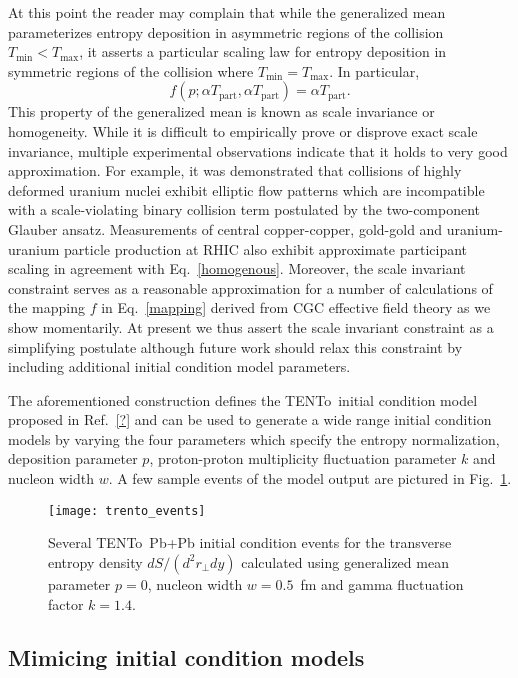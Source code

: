 \documentclass[aps,prc,reprint,amsmath,nofootinbib]{revtex4-1}
\newcommand{\trento}{T\raisebox{-0.5ex}{R}ENTo}
\begin{document}
At this point the reader may complain that while the generalized mean parameterizes entropy deposition in asymmetric regions of the collision $T_\text{min} < T_\text{max}$, it asserts a particular scaling law for entropy deposition in symmetric regions of the collision where $T_\text{min} = T_\text{max}$. In particular, 
\begin{equation}
    \label{homogenous}
    f(p; \alpha T_\text{part}, \alpha T_\text{part}) = \alpha T_\text{part}. 
\end{equation}
This property of the generalized mean is known as scale invariance or homogeneity. While it is difficult to empirically prove or disprove exact scale invariance, multiple experimental observations indicate that it holds to very good approximation. For example, it was demonstrated that collisions of highly deformed uranium nuclei exhibit elliptic flow patterns which are incompatible with a scale-violating binary collision term postulated by the two-component Glauber ansatz. Measurements of central copper-copper, gold-gold and uranium-uranium particle production at RHIC also exhibit approximate participant scaling in agreement with Eq.~\eqref{homogenous}. Moreover, the scale invariant constraint serves as a reasonable approximation for a number of calculations of the mapping $f$ in Eq.~\eqref{mapping} derived from CGC effective field theory as we show momentarily. At present we thus assert the scale invariant constraint as a simplifying postulate although future work should relax this constraint by including additional initial condition model parameters.  

The aforementioned construction defines the \trento\ initial condition model proposed in Ref.~\ref{?} and can be used to generate a wide range initial condition models by varying the four parameters which specify the entropy normalization, deposition parameter $p$, proton-proton multiplicity fluctuation parameter $k$ and nucleon width $w$. A few sample events of the model output are pictured in Fig.~\ref{fig:trento_events}. 

\begin{figure}
    \texttt{[image: trento\_events]}
    \caption{Several \protect\trento\ Pb+Pb initial condition events for the transverse entropy density $dS/(d^2r_\perp dy)$ calculated using generalized mean parameter $p=0$, nucleon width $w=0.5$~fm and gamma fluctuation factor $k=1.4$.}
    \label{fig:trento_events}
\end{figure}

\subsection{Mimicing initial condition models}
\end{document}
